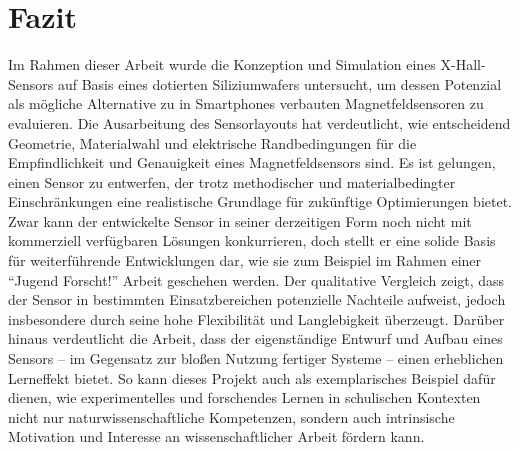 \documentclass[12pt, a4paper]{article}
\begin{document}
\section{Fazit}
Im Rahmen dieser Arbeit wurde die Konzeption und Simulation eines X-Hall-Sensors auf Basis eines dotierten Siliziumwafers untersucht, um dessen Potenzial als mögliche Alternative zu in Smartphones verbauten Magnetfeldsensoren zu evaluieren.
Die Ausarbeitung des Sensorlayouts hat verdeutlicht, wie entscheidend Geometrie, Materialwahl und elektrische Randbedingungen für die Empfindlichkeit und Genauigkeit eines Magnetfeldsensors sind.\newline
Es ist gelungen, einen Sensor zu entwerfen, der trotz methodischer und materialbedingter Einschränkungen eine realistische Grundlage für zukünftige Optimierungen bietet. Zwar kann der entwickelte Sensor in seiner derzeitigen Form noch nicht mit kommerziell verfügbaren Lösungen konkurrieren, doch stellt er eine solide Basis für weiterführende Entwicklungen dar, wie sie zum Beispiel im Rahmen einer ``Jugend Forscht!'' Arbeit geschehen werden.\newline
Der qualitative Vergleich zeigt, dass der Sensor in bestimmten Einsatzbereichen potenzielle Nachteile aufweist, jedoch insbesondere durch seine hohe Flexibilität und Langlebigkeit überzeugt.\newline
Darüber hinaus verdeutlicht die Arbeit, dass der eigenständige Entwurf und Aufbau eines Sensors – im Gegensatz zur bloßen Nutzung fertiger Systeme – einen erheblichen Lerneffekt bietet. So kann dieses Projekt auch als exemplarisches Beispiel dafür dienen, wie experimentelles und forschendes Lernen in schulischen Kontexten nicht nur naturwissenschaftliche Kompetenzen, sondern auch intrinsische Motivation und Interesse an wissenschaftlicher Arbeit fördern kann.\pagebreak




\end{document}

